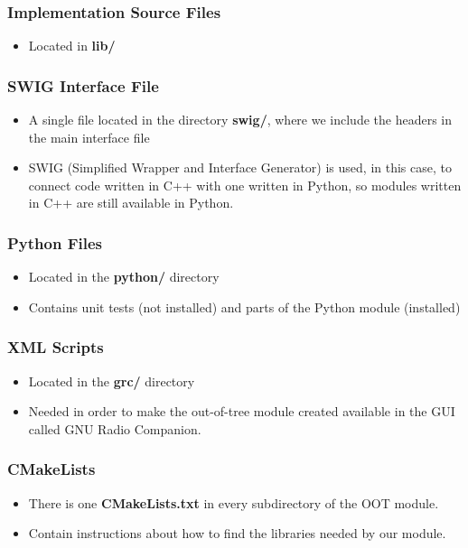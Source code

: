 \subsubsection*{Implementation Source Files}
\begin{itemize}
  \item Located in \textbf{lib/}
\end{itemize}

\subsubsection*{SWIG Interface File}
\begin{itemize}
  \item A single file located in the directory \textbf{swig/}, where we include the
  headers in the main interface file
  \item SWIG (Simplified Wrapper and Interface Generator) is used, in this case, to
connect code written in C++ with one written in Python, so modules written in
C++ are still available in Python\cite{swig}.
\end{itemize}

\subsubsection*{Python Files}
\begin{itemize}
  \item Located in the \textbf{python/} directory
  \item Contains unit tests (not installed) and parts of the Python module (installed)
\end{itemize}

\subsubsection*{XML Scripts}
\begin{itemize}
  \item Located in the \textbf{grc/} directory
  \item Needed in order to make the out-of-tree module created available in the GUI
	called GNU Radio Companion\cite{grc}.
\end{itemize}

\subsubsection*{CMakeLists}
\begin{itemize}
	\item There is one \textbf{CMakeLists.txt} in every subdirectory of the OOT
		module.
	\item Contain instructions about how to find the libraries needed by our
		module.
\end{itemize}
